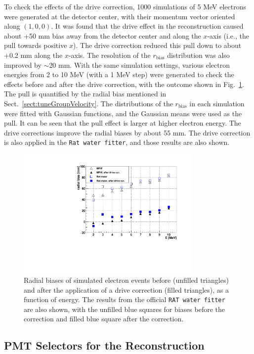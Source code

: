 To check the effects of the drive correction, 1000 simulations of 5 MeV electrons were generated at the detector center, with their momentum vector oriented along $(1,0,0)$. It was found that the drive effect in the reconstruction caused about +50 mm bias away from the detector center and along the $x$-axis (i.e., the pull towards positive $x$). The drive correction reduced this pull down to about +0.2 mm along the $x$-axis. The resolution of the $r_\mathrm{bias}$ distribution was also improved by $\sim$20 mm. With the same simulation settings, various electron energies from 2 to 10 MeV (with a 1 MeV step) were generated to check the effects before and after the drive correction, with the outcome shown in Fig.~\ref{fig:drivecorVsEnergy}. The pull is quantified by the radial bias mentioned in Sect.~\ref{sect:tuneGroupVelocity}. The distributions of the $r_\mathrm{bias}$ in each simulation were fitted with Gaussian functions, and the Gaussian means were used as the pull. It can be seen that the pull effect is larger at higher electron energy. The drive corrections improve the radial biases by about 55 mm. The drive correction is also applied in the \texttt{Rat water fitter}, and those results are also shown.
\begin{figure}[!htb]
	\centering
	\includegraphics[width=9cm]{pullEffectVsEnergy.pdf}
	\caption[Radial biases of simulated electron events as a function of energy.]{Radial biases of simulated electron events before (unfilled triangles) and after the application of a drive correction (filled triangles), as a function of energy. The results from the official \texttt{RAT water fitter} are also shown, with the unfilled blue squares for biases before the correction and filled blue square after the correction. \label{fig:drivecorVsEnergy}}
\end{figure}

\subsection{PMT Selectors for the Reconstruction}\label{sect:PMTselector}


